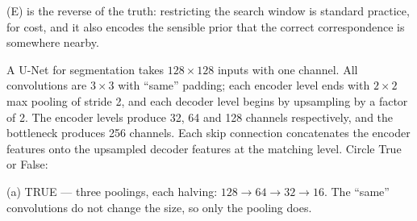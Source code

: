 \documentclass[11pt]{exam}
\newcommand{\TFT}{\ifprintanswers\textbf{TRUE}\hspace{1.1em}False\else True\hspace{1.1em}False\fi}
\newcommand{\TFF}{True\hspace{1.1em}\ifprintanswers\textbf{FALSE}\else False\fi}
\begin{document}
\begin{questions}
\begin{solution}
  (E) is the reverse of the truth: restricting the search window is standard practice, for cost, and
  it also encodes the sensible prior that the correct correspondence is somewhere nearby.
\end{solution}

\question
A U-Net for segmentation takes $128 \times 128$ inputs with one channel. All convolutions are
$3 \times 3$ with ``same'' padding; each encoder level ends with $2 \times 2$ max pooling of stride
2, and each decoder level begins by upsampling by a factor of 2. The encoder levels produce 32, 64
and 128 channels respectively, and the bottleneck produces 256 channels. Each skip connection
concatenates the encoder features onto the upsampled decoder features at the matching level. Circle
True or False:


\begin{solution}
  (a) TRUE --- three poolings, each halving: $128 \rightarrow 64 \rightarrow 32 \rightarrow 16$.
  The ``same'' convolutions do not change the size, so only the pooling does.


\end{solution}
\end{questions}
\end{document}
